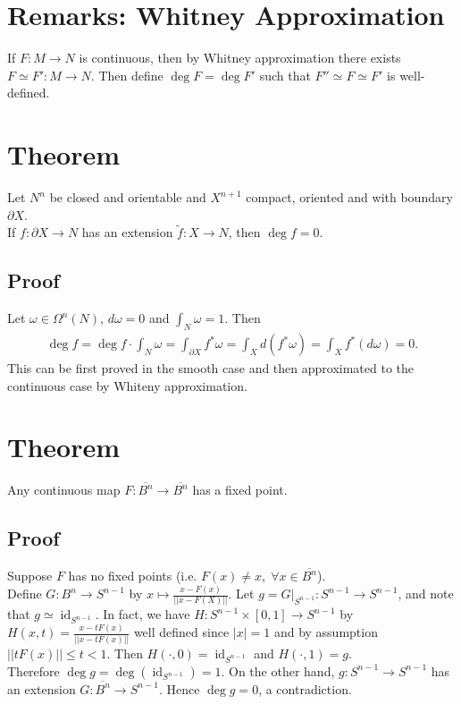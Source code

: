 \documentclass[11pt]{article}
\begin{document}
\section*{Remarks: Whitney Approximation}
\label{sec:org59faa79}
If \(F:M\to N\) is continuous, then by Whitney approximation there exists \(F\simeq F':M\to N\). Then define \(\operatorname{deg}F=\operatorname{deg}F'\) such that \(F''\simeq F\simeq F'\) is well-defined.\\
\section*{Theorem}
\label{sec:org2d31568}
Let \(N^{n}\) be closed and orientable and \(X^{n+1}\) compact, oriented and with boundary \(\partial X\).\\
If \(f:\partial X\to N\) has an extension \(\tilde{f}:X\to N\), then \(\operatorname{deg}f=0\).\\
\subsection*{Proof}
\label{sec:org9792c0d}
Let \(\omega\in\Omega^{n}(N)\), \(d\omega=0\) and \(\int_{N}\omega=1\). Then\\
\begin{align*}
  \operatorname{deg}f
  =\operatorname{deg}f\cdot\int_{N}\omega
  =\int_{\partial X}f^{*}\omega
  =\int_{X}d(f^{*}\omega)
  =\int_{X}f^{*}(d\omega)
  =0.
\end{align*}
This can be first proved in the smooth case and then approximated to the continuous case by Whiteny approximation.\\
\section*{Theorem}
\label{sec:org5cd9e0c}
Any continuous map \(F:\overline{B^{n}}\to\overline{B^{n}}\) has a fixed point.\\
\subsection*{Proof}
\label{sec:orgf64e73a}
Suppose \(F\) has no fixed points (i.e. \(F(x)\neq x,\;\forall x\in\overline{B^{n}}\)).\\
Define \(G:B^{n}\to S^{n-1}\) by \(x\mapsto\frac{x-F(x)}{||x-F(X)||}\). Let \(g=G|_{S^{n-1}}:S^{n-1}\to S^{n-1}\), and note that \(g\simeq\operatorname{id}_{S^{n-1}}\). In fact, we have \(H:S^{n-1}\times [0,1]\to S^{n-1}\) by \(H(x,t)=\frac{x-tF(x)}{||x-tF(x)||}\) well defined since \(|x|=1\) and by assumption \(||tF(x)||\leq t<1\). Then \(H(\cdot,0)=\operatorname{id}_{S^{n-1}}\) and \(H(\cdot,1)=g\).\\
Therefore \(\operatorname{deg}g=\operatorname{deg}(\operatorname{id}_{S^{n-1}})=1\). On the other hand, \(g:S^{n-1}\to S^{n-1}\) has an extension \(G:\overline{B^{n}}\to S^{n-1}\). Hence \(\operatorname{deg}g=0\), a contradiction.\\
\end{document}
